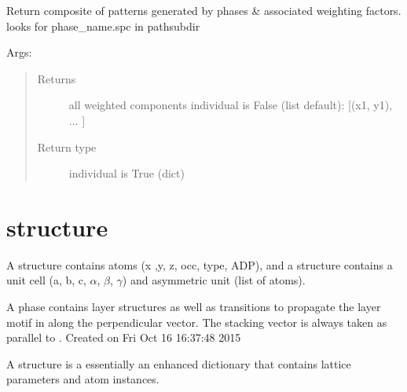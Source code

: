 \documentclass[letterpaper,10pt,english]{sphinxmanual}
\begin{document}
\begin{fulllineitems}
\begin{fulllineitems}
\begin{quote}
\begin{description}
\end{description}\end{quote}

\end{fulllineitems}


\begin{fulllineitems}
\label{\detokenize{rst/refinement:mstack.refinement.Refinement.weighted_composite}}
Return composite of patterns generated by phases \& associated weighting factors.
looks for phase\_name.spc in pathsubdir

Args:
\begin{quote}\begin{description}
\item[{Returns}] \leavevmode
all weighted components
individual is False (list \textbar{} default): {[}(x1, y1), ... {]}

\item[{Return type}] \leavevmode
individual is True (dict)

\end{description}\end{quote}

\end{fulllineitems}


\end{fulllineitems}



\section{structure}
\label{\detokenize{rst/structure::doc}}\label{\detokenize{rst/structure:structure}}
A structure contains atoms (x ,y, z, occ, type, ADP), and
a structure contains a unit cell (a, b, c, \(\alpha\), \(\beta\), \(\gamma\)) and asymmetric
unit (list of atoms).

A phase contains layer structures as well as transitions to
propagate the layer motif in along the perpendicular vector.
The stacking vector is always taken as parallel to .
\label{\detokenize{rst/structure:module-mstack.structure}}
Created on Fri Oct 16 16:37:48 2015

A structure is a essentially an enhanced dictionary that contains
lattice parameters and atom instances.
\end{document}
